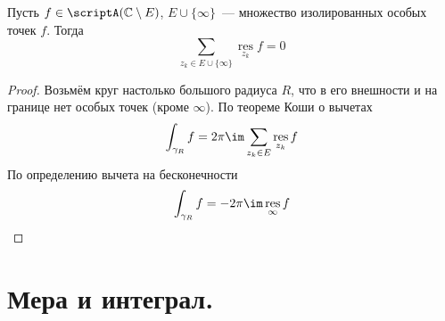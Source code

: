 \documentclass{article}
\begin{document}
    \begin{theorem}
        Пусть $f\in\scriptA(\mathbb C\setminus E)$, $E\cup\{\infty\}$~--- множество изолированных особых точек $f$. Тогда
        $$
        \sum\limits_{z_k\in E\cup\{\infty\}}\operatorname*{res}_{z_k}f=0
        $$
    \end{theorem}
    \begin{proof}
        Возьмём круг настолько большого радиуса $R$, что в его внешности и на границе нет особых точек (кроме $\infty$). По теореме Коши о вычетах
        $$
        \int_{\gamma_R}f=2\pi\im\sum\limits_{z_k\in E}\operatorname*{res}_{z_k}f
        $$
        По определению вычета на бесконечности
        $$
        \int_{\gamma_R}f=-2\pi\im\operatorname*{res}_\infty f
        $$
    \end{proof}
    \section{Мера и интеграл.}
\end{document}
